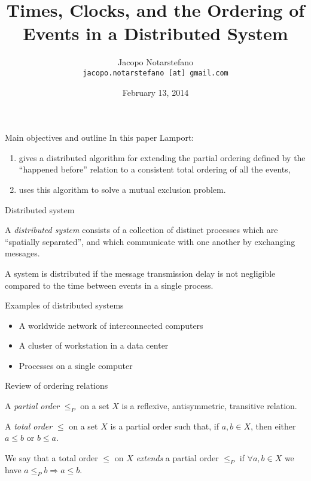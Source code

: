 \documentclass[12pt]{beamer}
\title[Times, Clocks and the ordering of Events]{Times, Clocks, and the Ordering of Events in a Distributed System}
\author[Jacopo Notarstefano]{
    Jacopo Notarstefano\\
    \texttt{jacopo.notarstefano [at] gmail.com}
}
\date{February 13, 2014}
\begin{document}
    \begin{frame}[plain]
        \titlepage
    \end{frame}

    \begin{frame}{Main objectives and outline}
        In this paper Lamport:
        \begin{enumerate}
            \item gives a distributed algorithm for extending the partial
            ordering defined by the ``happened before'' relation to a consistent
            total ordering of all the events,
            \item uses this algorithm to solve a mutual exclusion problem.
        \end{enumerate}
    \end{frame}

    \begin{frame}{Distributed system}
        \begin{definition}
            A \emph{distributed system} consists of a collection of distinct processes
            which are ``spatially separated'', and which communicate with one another
            by exchanging messages.

            A system is distributed if the message transmission delay is not
            negligible compared to the time between events in a single process.
        \end{definition}
    \end{frame}

    \begin{frame}{Examples of distributed systems}
        \begin{itemize}
            \item A worldwide network of interconnected computers
            \item A cluster of workstation in a data center
            \item Processes on a single computer
        \end{itemize}
    \end{frame}

    \begin{frame}{Review of ordering relations}
        \begin{definition}
            A \emph{partial order} \(\le_{P}\) on a set \(X\) is a reflexive, antisymmetric,
            transitive relation.
        \end{definition}
        \begin{definition}
            A \emph{total order} \(\le\) on a set \(X\) is a partial order such that, if
            \(a,b\in X\), then either \(a\le b\) or \(b\le a\).
        \end{definition}
        \begin{definition}
            We say that a total order \(\le\) on \(X\) \emph{extends} a partial order
            \(\le_{P}\) if \(\forall a,b\in X\) we have \(a\le_{P}b\Rightarrow a\le b\).
        \end{definition}
    \end{frame}
\end{document}
